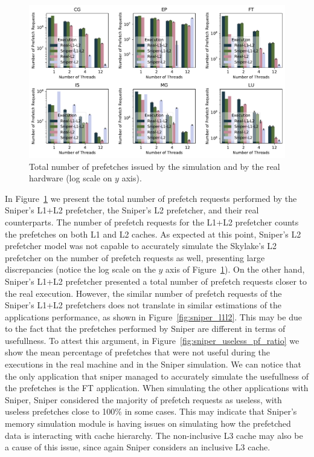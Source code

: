 \documentclass[AMA,final,STIX1COL]{WileyNJD-v2}
\begin{document}
\begin{figure}[b]
    \centering
    \includegraphics[width=.8\linewidth]{figures/sniper_l2-rqsts-all-pf.pdf}
    \caption{Total number of prefetches issued by the simulation and by the real hardware (log scale on $y$ axis).}
    \label{fig:sniper_l2-rqsts-all-pf}
\end{figure}


In Figure~\ref{fig:sniper_l2-rqsts-all-pf} we present the total number of prefetch requests performed by the Sniper's L1+L2 prefetcher, the Sniper's L2 prefetcher, and their real counterparts. The number of prefetch requests for the L1+L2 prefetcher counts the prefetches on both L1 and L2 caches.
As expected at this point, Sniper's L2 prefetcher model was not capable to accurately simulate the Skylake's L2 prefetcher on the number of prefetch requests as well, presenting large discrepancies (notice the log scale on the $y$ axis of Figure~\ref{fig:sniper_l2-rqsts-all-pf}).
On the other hand, Sniper's L1+L2 prefetcher presented a total number of prefetch requests closer to the real execution. 
However, the similar number of prefetch requests of the Sniper's L1+L2 prefetchers does not translate in similar estimations of the applications performance, as shown in Figure~\ref{fig:sniper_l1l2}.
This may be due to the fact that the prefetches performed by Sniper are different in terms of usefullness. 
To attest this argument, in Figure~\ref{fig:sniper_useless_pf_ratio} we show the mean percentage of prefetches that were not useful during the executions in the real machine and in the Sniper simulation.
We can notice that the only application that sniper managed to accurately simulate the usefullness of the prefetches is the FT application.
When simulating the other applications with Sniper, Sniper considered the majority of prefetch requests as useless, with useless prefetches close to 100\% in some cases. 
This may indicate that Sniper's memory simulation module is having issues on simulating how the prefetched data is interacting with cache hierarchy. 
The non-inclusive L3 cache may also be a cause of this issue, since again Sniper considers an inclusive L3 cache.
\end{document}

